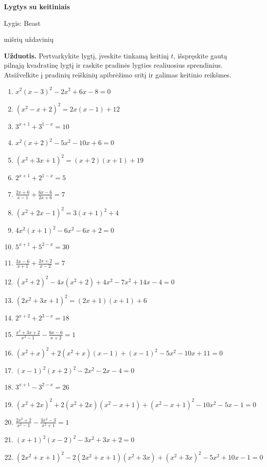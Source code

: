 \documentclass[11pt,a4paper]{article}
\begin{document}
\begin{center}
{\Large\bfseries Lygtys su keitiniais}

\medskip
{\large Lygis: Beast}

 mišrių uždavinių
\end{center}
\textbf{Užduotis.} Pertvarkykite lygtį, įveskite tinkamą keitinį \(t\),
išspręskite gautą pilnąją kvadratinę lygtį ir raskite pradinės lygties
realiuosius sprendinius. Atsižvelkite į pradinių reiškinių apibrėžimo sritį
ir galimas keitinio reikšmes.
\medskip
\begin{enumerate}
\item \(\displaystyle x^2(x-3)^2-2x^2+6x-8=0\)
\item \(\displaystyle (x^2-x+2)^2=2x(x-1)+12\)
\item \(\displaystyle 3^{x+1}+3^{1-x}=10\)
\item \(\displaystyle x^2(x+2)^2-5x^2-10x+6=0\)
\item \(\displaystyle (x^2+3x+1)^2=(x+2)(x+1)+19\)
\item \(\displaystyle 2^{x+1}+2^{1-x}=5\)
\item \(\displaystyle \frac{2x+6}{x-1}+\frac{6x-6}{2x+6}=7\)
\item \(\displaystyle (x^2+2x-1)^2=3(x+1)^2+4\)
\item \(\displaystyle 4x^2(x+1)^2-6x^2-6x+2=0\)
\item \(\displaystyle 5^{x+1}+5^{2-x}=30\)
\item \(\displaystyle \frac{3x-6}{x+1}+\frac{2x+2}{x-2}=7\)
\item \(\displaystyle (x^2+2)^2-4x(x^2+2)+4x^2-7x^2+14x-4=0\)
\item \(\displaystyle (2x^2+3x+1)^2=(2x+1)(x+1)+6\)
\item \(\displaystyle 2^{x+2}+2^{3-x}=18\)
\item \(\displaystyle \frac{x^2+3x+2}{x^2-1}-\frac{6x-6}{x+2}=1\)
\item \(\displaystyle (x^2+x)^2+2(x^2+x)(x-1)+(x-1)^2-5x^2-10x+11=0\)
\item \(\displaystyle (x-1)^2(x+2)^2-2x^2-2x-4=0\)
\item \(\displaystyle 3^{x+1}-3^{2-x}=26\)
\item \(\displaystyle (x^2+2x)^2+2(x^2+2x)(x^2-x+1)+(x^2-x+1)^2-10x^2-5x-1=0\)
\item \(\displaystyle \frac{2x^2+2}{x^2-1}-\frac{3x^2-3}{x^2+1}=1\)
\item \(\displaystyle (x+1)^2(x-2)^2-3x^2+3x+2=0\)
\item \(\displaystyle (2x^2+x+1)^2-2(2x^2+x+1)(x^2+3x)+(x^2+3x)^2-5x^2+10x-1=0\)

\end{enumerate}
\end{document}
